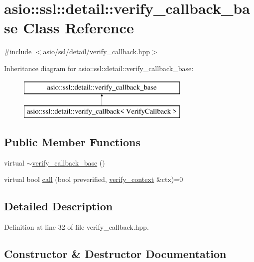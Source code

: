 \hypertarget{classasio_1_1ssl_1_1detail_1_1verify__callback__base}{}\section{asio\+:\+:ssl\+:\+:detail\+:\+:verify\+\_\+callback\+\_\+base Class Reference}
\label{classasio_1_1ssl_1_1detail_1_1verify__callback__base}


{\ttfamily \#include $<$asio/ssl/detail/verify\+\_\+callback.\+hpp$>$}

Inheritance diagram for asio\+:\+:ssl\+:\+:detail\+:\+:verify\+\_\+callback\+\_\+base\+:\begin{figure}[H]
\begin{center}
\leavevmode
\includegraphics[height=2.000000cm]{classasio_1_1ssl_1_1detail_1_1verify__callback__base}
\end{center}
\end{figure}
\subsection*{Public Member Functions}
\begin{DoxyCompactItemize}
\item 
virtual \hyperlink{classasio_1_1ssl_1_1detail_1_1verify__callback__base_a6896db1b70d5cc0b8165203a29084419}{$\sim$verify\+\_\+callback\+\_\+base} ()
\item 
virtual bool \hyperlink{classasio_1_1ssl_1_1detail_1_1verify__callback__base_a1b639922c74bd99d05a8b1fdda6cef3b}{call} (bool preverified, \hyperlink{classasio_1_1ssl_1_1verify__context}{verify\+\_\+context} \&ctx)=0
\end{DoxyCompactItemize}


\subsection{Detailed Description}


Definition at line 32 of file verify\+\_\+callback.\+hpp.



\subsection{Constructor \& Destructor Documentation}
\hypertarget{classasio_1_1ssl_1_1detail_1_1verify__callback__base_a6896db1b70d5cc0b8165203a29084419}{}
